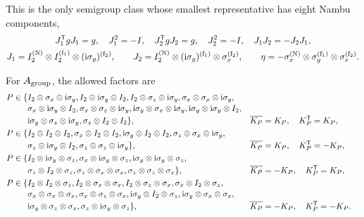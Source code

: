 This is the only semigroup class whose smallest representative has eight Nambu components,
\begin{equation}
\begin{gathered}
J_1^{\mathsf{T}} gJ_1=g,\quad J_1^2=-I,\quad
J_2^{\mathsf{T}} gJ_2=g,\quad J_2^2=-I,\quad
J_1J_2=-J_2J_1,\\
J_1=I_2^{({\rm N})}\otimes I_2^{({\rm f}_1)}\otimes(\mathrm{i}\sigma_y)^{({\rm f}_2)},\qquad
J_2=I_2^{({\rm N})}\otimes(\mathrm{i}\sigma_y)^{({\rm f}_1)}\otimes\sigma_x^{({\rm f}_2)},\qquad
\eta=-\sigma_x^{({\rm N})}\otimes\sigma_y^{({\rm f}_1)}\otimes\sigma_x^{({\rm f}_2)}.
\end{gathered}
\end{equation}
\begin{samepage}
For \(A_{\rm group}\), the allowed factors are
\begin{align*}
P\in\{&I_2\otimes\sigma_x\otimes\mathrm{i}\sigma_y,
I_2\otimes\mathrm{i}\sigma_y\otimes I_2,
I_2\otimes\sigma_z\otimes\mathrm{i}\sigma_y,
\sigma_x\otimes\sigma_x\otimes\mathrm{i}\sigma_y,\\[-2pt]
&\sigma_x\otimes\mathrm{i}\sigma_y\otimes I_2,
\sigma_x\otimes\sigma_z\otimes\mathrm{i}\sigma_y,
\mathrm{i}\sigma_y\otimes\sigma_x\otimes\mathrm{i}\sigma_y,
\mathrm{i}\sigma_y\otimes\mathrm{i}\sigma_y\otimes I_2,\\[-2pt]
&\mathrm{i}\sigma_y\otimes\sigma_z\otimes\mathrm{i}\sigma_y,
\sigma_z\otimes I_2\otimes I_2\},
&&\overline{K_P}=K_P,\quad K_P^{\mathsf{T}}=K_P,\\
P\in\{&I_2\otimes I_2\otimes I_2,
\sigma_x\otimes I_2\otimes I_2,
\mathrm{i}\sigma_y\otimes I_2\otimes I_2,
\sigma_z\otimes\sigma_x\otimes\mathrm{i}\sigma_y,\\[-2pt]
&\sigma_z\otimes\mathrm{i}\sigma_y\otimes I_2,
\sigma_z\otimes\sigma_z\otimes\mathrm{i}\sigma_y\},
&&\overline{K_P}=K_P,\quad K_P^{\mathsf{T}}=-K_P,\\
P\in\{&I_2\otimes\mathrm{i}\sigma_y\otimes\sigma_z,
\sigma_x\otimes\mathrm{i}\sigma_y\otimes\sigma_z,
\mathrm{i}\sigma_y\otimes\mathrm{i}\sigma_y\otimes\sigma_z,\\[-2pt]
&\sigma_z\otimes I_2\otimes\sigma_z,
\sigma_z\otimes\sigma_x\otimes\sigma_x,
\sigma_z\otimes\sigma_z\otimes\sigma_x\},
&&\overline{K_P}=-K_P,\quad K_P^{\mathsf{T}}=K_P,\\
P\in\{&I_2\otimes I_2\otimes\sigma_z,
I_2\otimes\sigma_x\otimes\sigma_x,
I_2\otimes\sigma_z\otimes\sigma_x,
\sigma_x\otimes I_2\otimes\sigma_z,\\[-2pt]
&\sigma_x\otimes\sigma_x\otimes\sigma_x,
\sigma_x\otimes\sigma_z\otimes\sigma_x,
\mathrm{i}\sigma_y\otimes I_2\otimes\sigma_z,
\mathrm{i}\sigma_y\otimes\sigma_x\otimes\sigma_x,\\[-2pt]
&\mathrm{i}\sigma_y\otimes\sigma_z\otimes\sigma_x,
\sigma_z\otimes\mathrm{i}\sigma_y\otimes\sigma_z\},
&&\overline{K_P}=-K_P,\quad K_P^{\mathsf{T}}=-K_P.
\end{align*}
\end{samepage}
